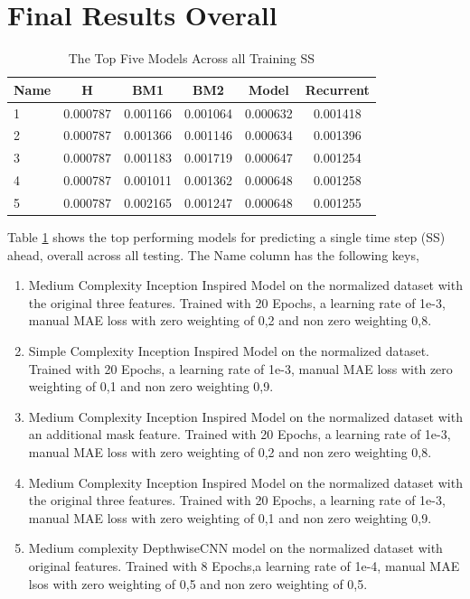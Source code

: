 \section{Final Results Overall}
\begin{table}[htbp]
	\centering
	\caption{The Top Five Models Across all Training SS}
	\label{tab:best_ss}
	\begin{tabular}{p{2cm}ccccc}
		\toprule
		Name &  H &  BM1 &  BM2 &  Model &  Recurrent \\
		\midrule
		1 &       0.000787 &        0.001166 &        0.001064 &   0.000632 &            0.001418 \\
		2 &       0.000787 &        0.001366 &        0.001146 &   0.000634 &            0.001396 \\
		3 &       0.000787 &        0.001183 &        0.001719 &   0.000647 &            0.001254 \\
		4 &       0.000787 &        0.001011 &        0.001362 &   0.000648 &            0.001258 \\
		5 &       0.000787 &        0.002165 &        0.001247 &   0.000648 &            0.001255 \\
		\bottomrule
	\end{tabular}
\end{table}
Table \ref{tab:best_ss} shows the top performing models for predicting a single time step (SS) ahead, overall across all testing. The Name column has the following keys,
\begin{enumerate}
	\item Medium Complexity Inception Inspired Model on the normalized dataset with the original three features. Trained with 20 Epochs, a learning rate of 1e-3, manual MAE loss with zero weighting of 0,2 and non zero weighting 0,8.
	\item Simple Complexity Inception Inspired Model on the normalized dataset. Trained with 20 Epochs, a learning rate of 1e-3, manual MAE loss with zero weighting of 0,1 and non zero weighting 0,9.
	\item Medium Complexity Inception Inspired Model on the normalized dataset with an additional mask feature. Trained with 20 Epochs, a learning rate of 1e-3, manual MAE loss with zero weighting of 0,2 and non zero weighting 0,8.
	\item Medium Complexity Inception Inspired Model on the normalized dataset with the original three features. Trained with 20 Epochs, a learning rate of 1e-3, manual MAE loss with zero weighting of 0,1 and non zero weighting 0,9.
	\item Medium complexity DepthwiseCNN model on the normalized dataset with original features. Trained with 8 Epochs,a learning rate of 1e-4, manual MAE lsos with zero weighting of 0,5 and non zero weighting of 0,5.
\end{enumerate}

